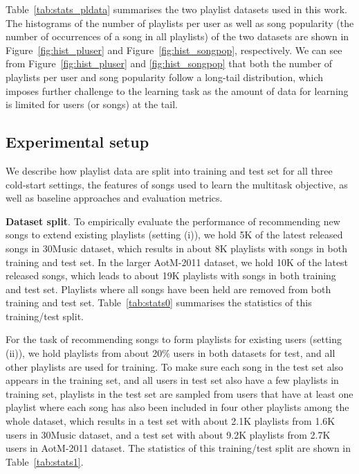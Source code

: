 Table~\ref{tab:stats_pldata} summarises the two playlist datasets used in this work.
The histograms of the number of playlists per user as well as song popularity 
(\ie the number of occurrences of a song in all playlists)
of the two datasets are shown in Figure~\ref{fig:hist_pluser} and Figure~\ref{fig:hist_songpop},
respectively.
We can see from Figure~\ref{fig:hist_pluser} and \ref{fig:hist_songpop} that both the number
of playlists per user and song popularity follow a long-tail distribution, which imposes further challenge to the learning task as the amount
of data for learning is limited for users (or songs) at the tail.






\subsection{Experimental setup}

We describe how playlist data are split into training and test set for all three cold-start settings,
the features of songs used to learn the multitask objective, as well as baseline approaches and evaluation metrics.

{\bf Dataset split}.
To empirically evaluate the performance of recommending new songs to extend existing playlists (setting (i)),
we hold 5K of the latest released songs in 30Music dataset, which results in about 8K playlists with songs
in both training and test set.
In the larger AotM-2011 dataset, we hold 10K of the latest released songs, which leads to about 19K playlists with songs
in both training and test set.
Playlists where all songs have been held are removed from both training and test set.
Table~\ref{tab:stats0} summarises the statistics of this training/test split.

For the task of recommending songs to form playlists for existing users (setting (ii)),
we hold playlists from about 20\% users in both datasets for test, and all other playlists are used for training.
To make sure each song in the test set also appears in the training set,
and all users in test set also have a few playlists in training set,
playlists in the test set are sampled from users that have at least one playlist where each song has also been
included in four other playlists among the whole dataset,
which results in a test set with about 2.1K playlists from 1.6K users in 30Music dataset,
and a test set with about 9.2K playlists from 2.7K users in AotM-2011 dataset.
The statistics of this training/test split are shown in Table~\ref{tab:stats1}.

